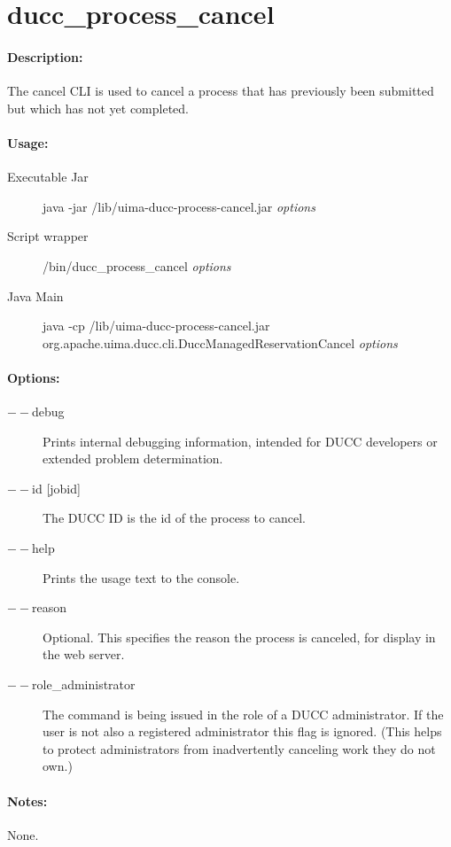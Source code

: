 \ifpdf
\else
{}
\fi
    \section{ducc\_process\_cancel}

    \paragraph{Description:}
    The cancel CLI is used to cancel a process that has previously been submitted but which has not yet 
    completed. 

    \paragraph{Usage:}
    \begin{description}
    \item[Executable Jar] java -jar \ducchome/lib/uima-ducc-process-cancel.jar {\em options}
    \item[Script wrapper] \ducchome/bin/ducc\_process\_cancel {\em options}
    \item[Java Main]      java -cp \ducchome/lib/uima-ducc-process-cancel.jar org.apache.uima.ducc.cli.DuccManagedReservationCancel {\em options}
    \end{description}

    \paragraph{Options:}
    \begin{description}
        \item[$--$debug ]          
          Prints internal debugging information, intended for DUCC developers or extended problem determination.          
        \item[$--$id {[jobid]}]
          The DUCC ID is the id of the process to cancel.
        \item[$--$help]
          Prints the usage text to the console.
        \item[$--$reason]
          Optional. This specifies the reason the process is canceled, for display in the web server. 
        \item[$--$role\_administrator] The command is being issued in the role of a DUCC administrator.
          If the user is not also a registered administrator this flag is ignored.  (This helps to
          protect administrators from inadvertently canceling work they do not own.)
     \end{description}
        
    \paragraph{Notes:}
    None.

